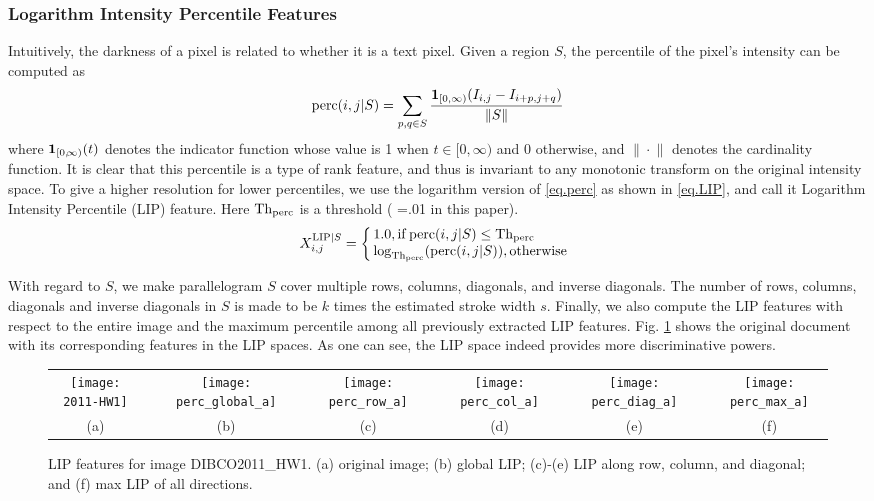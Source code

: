\documentclass[onecolumn,11pt,draftcls,journal]{IEEEtran}
\newcommand{\im}[1]{{\bf{#1}}}
\def\fwIb{.16}
\begin{document}
\subsubsection{Logarithm Intensity Percentile Features}
Intuitively, the darkness of a pixel is related to whether it is a text pixel. Given a region $S$, the percentile of the pixel's intensity can be computed as
\begin{equation}{\rm perc}(i,j|S) = \sum_{p,q\in S} {\im{1}_{[0,\infty)}(I_{i,j}- I_{i+p,j+q})\over \|S\|}
\label{eq.perc}
\end{equation}
where $\im{1}_{[0,\!\infty)}(t)$ denotes the indicator function whose value is 1 when $t\!\in\![0\!,\!\infty)$ and 0 otherwise, and $\|\!\cdot\!\|$ denotes the cardinality function. It is clear that this percentile is a type of rank feature, and thus is invariant to any monotonic transform on the original intensity space. To give a higher resolution for lower percentiles, we use the logarithm version of \eqref{eq.perc} as shown in \eqref{eq.LIP}, and call it Logarithm Intensity Percentile (LIP) feature. Here $\rm{Th}_{perc}$ is a threshold ( =.01 in this paper). 
\begin{equation}
X_{i,j}^{{{\rm{LIP}}|S}} =\left\{
\begin{array}{l}
\!\!1.0, {\rm if}\,{\rm perc}(i,j|S)\leq\rm{{Th}_{perc}}\\
\!\!\displaystyle\log_{\rm{{Th}_{perc}}}({\rm perc}(i,j|S) ), {\rm otherwise}
\end{array}
\right.
\label{eq.LIP}
\end{equation}

With regard to $S$, we make parallelogram $S$ cover multiple rows, columns, diagonals, and inverse diagonals. The number of rows, columns, diagonals and inverse diagonals in $S$ is made to be $k$ times the estimated stroke width $s$. Finally, we also compute the LIP features with respect to the entire image and the maximum percentile among all previously extracted LIP features. Fig. \ref{fig.lip} shows the original document with its corresponding features in the LIP spaces. As one can see, the LIP space indeed provides more discriminative powers. 
\begin{figure}[!h]
\centering\scriptsize
\begin{tabular}{@{}c@{}m{.05cm}@{}c@{}m{.05cm}@{}c@{}m{.05cm}@{}c@{}m{.05cm}@{}c@{}m{.05cm}@{}c@{}}
\texttt{[image: 2011-HW1]}&&
\texttt{[image: perc\_global\_a]}&&
\texttt{[image: perc\_row\_a]}&&
\texttt{[image: perc\_col\_a]}&&
\texttt{[image: perc\_diag\_a]}&&
\texttt{[image: perc\_max\_a]}\\{(a)}&&
{(b)}&&
{(c)}&&
{(d)}&&
{(e)}&&
{(f)}\\
\end{tabular}
\caption{LIP features for image DIBCO2011\_HW1. (a) original  image; (b) global LIP; (c)-(e) LIP along row, column, and diagonal; and (f) max LIP of all directions.}\label{fig.lip}
\end{figure}
\end{document}
